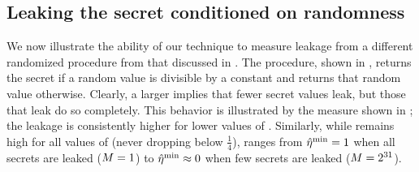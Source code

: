 \subsection{Leaking the secret conditioned on randomness}
\label{sscf:sec:micro:random}
We now illustrate the ability of our technique to measure leakage from
a different randomized procedure from that discussed in
.  The procedure, shown in
, returns the secret if a random value is
divisible by a constant \modulus and returns that random value
otherwise.  Clearly, a larger \modulus implies that fewer secret
values leak, but those that leak do so completely.  This behavior is
illustrated by the \JaccardRand{\secretsSetSize} measure shown in
; the leakage is consistently higher for
lower values of \modulus.  Similarly, while \secretsSetSizeMaxRand{}
remains high for all values of \modulus (never dropping below
$\frac{1}{4}$), \secretsSetSizeMinRand{} ranges from
$\hat{\eta}^{\textrm{min}}_{} = 1$ when all secrets are leaked ($M
= 1$) to $\hat{\eta}^{\textrm{min}}_{} \approx 0$ when few secrets are
leaked ($M = 2^{31}$).
